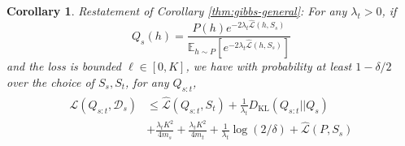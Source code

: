 \documentclass{article}
\theoremstyle{plain}
\newtheorem{corollary}[theorem]{Corollary}
\theoremstyle{definition}
\theoremstyle{remark}
\begin{document}

\begin{corollary} Restatement of Corollary \ref{thm:gibbs-general}:
For any $\lambda_t>0$, if $$Q_s(h)=\frac{P(h)e^{-2\lambda_t\hat{\mathcal{L}}(h,S_s)}}{\mathbb{E}_{h\sim P}\left [e^{-2\lambda_t\hat{\mathcal{L}}(h,S_s)} \right ]}$$ and the loss is bounded $\ell\in[0,K]$, 
we have with probability at least $1-\delta/2$ over the choice of $S_s,S_t$, for any $Q_{s:t}$, 
%
\begin{align}
\begin{split}
\mathcal{L}(Q_{s:t}, \mathcal{D}_s) &\leq \hat{\mathcal{L}}(Q_{s:t}, S_t) + \frac{1}{\lambda_t} D_{\mathrm{KL}}(Q_{s:t}||Q_{s})\\
&+\frac{\lambda_t K^2}{4m_s}+\frac{\lambda_t K^2}{4m_t}+\frac{1}{\lambda_t}\log(2/\delta)+ \hat{\mathcal{L}}(P, S_s)
\end{split}
\end{align}
\end{corollary}
\end{document}
